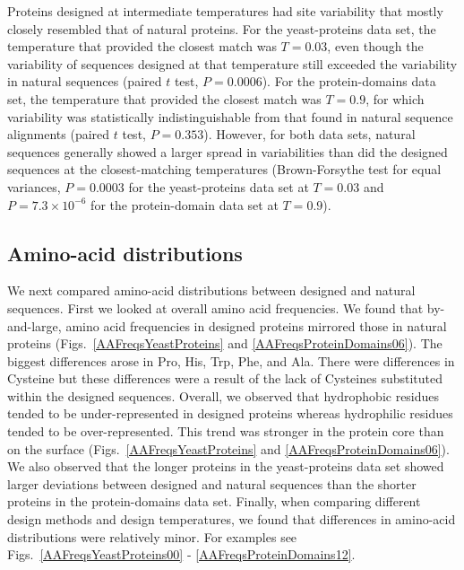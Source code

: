 \documentclass[12pt]{article}
\begin{document}
Proteins designed at intermediate temperatures had site variability that mostly closely resembled that of natural proteins. For the yeast-proteins data set, the temperature that provided the closest match was $T=0.03$, even though the variability of sequences designed at that temperature still exceeded the variability in natural sequences (paired $t$ test, $P= 0.0006$). For the protein-domains data set, the temperature that provided the closest match was $T=0.9$, for which variability was statistically indistinguishable from that found in natural sequence alignments (paired $t$ test, $P= 0.353$). However, for both data sets, natural sequences generally showed a larger spread in variabilities than did the designed sequences at the closest-matching temperatures (Brown-Forsythe test for equal variances, $P= 0.0003$ for the yeast-proteins data set at $T = 0.03$  and $P= 7.3\times 10^{-6}$ for the protein-domain data set at $T = 0.9$).

\subsection{Amino-acid distributions}
\label{AminoAcidDistributions}

We next compared amino-acid distributions between designed and natural sequences. First we looked at overall amino acid frequencies. We found that by-and-large, amino acid frequencies in designed proteins mirrored those in natural proteins (Figs.~\ref{AAFreqsYeastProteins} and \ref{AAFreqsProteinDomains06}). The biggest differences arose in Pro, His, Trp, Phe, and Ala. There were differences in Cysteine but these differences were a result of the lack of Cysteines substituted within the designed sequences.  Overall, we observed that hydrophobic residues tended to be under-represented in designed proteins whereas hydrophilic residues tended to be over-represented. This trend was stronger in the protein core than on the surface (Figs.~\ref{AAFreqsYeastProteins} and \ref{AAFreqsProteinDomains06}). We also observed that the longer proteins in the yeast-proteins data set showed larger deviations between designed and natural sequences than the shorter proteins in the protein-domains data set. Finally, when comparing different design methods and design temperatures, we found that differences in amino-acid distributions were relatively minor. For examples see Figs.~\ref{AAFreqsYeastProteins00}  - \ref{AAFreqsProteinDomains12}.
\end{document}
